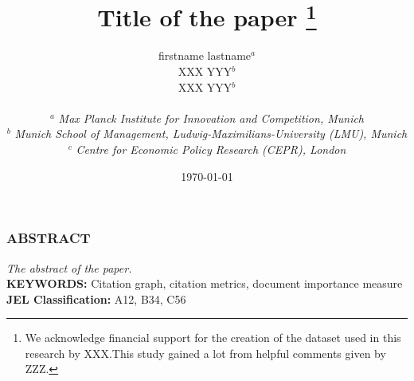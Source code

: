 



\title{\textbf{Title of the paper}
\thanks{We acknowledge financial support for the creation of the dataset used in this research by XXX.This study gained a lot from helpful comments given by ZZZ.}}


\author{
\begin{minipage}{0.3\textwidth}
    \begin{center}
    \vspace{0.1cm}
    {{firstname lastname}}$^{a}$
    \vspace{0.6cm}
    \end{center}
\end{minipage}
\begin{minipage}{0.3\textwidth}
    \begin{center}
    \vspace{0.1cm}
    XXX YYY$^{b}$
    \vspace{0.6cm}
    \end{center}
\end{minipage}
\begin{minipage}{0.3\textwidth}
    \begin{center}
    \vspace{0.1cm}
    XXX YYY$^{b}$
    \vspace{0.6cm}
    \end{center}
\end{minipage}
\\[2ex]
\renewcommand{\parskip}{-5pt}
\footnotesize $^{a}$  \emph{Max Planck Institute for Innovation and Competition, Munich}\\
\footnotesize $^{b}$  \emph{Munich School of Management, Ludwig-Maximilians-University (LMU), Munich}\\
\footnotesize $^{c}$  \emph{Centre for Economic Policy Research (CEPR), London}\\[2ex]
}

\date{\today}
\maketitle
\vspace{5mm}
\thispagestyle{empty}

\begin{center}
\subsubsection*{ABSTRACT}
\end{center}
{\small
\it
The abstract of the paper.
}
%
%
\vspace{10mm}\\
\textbf{KEYWORDS:} Citation graph, citation metrics, document importance measure
\vspace{2mm}\\
\textbf{JEL Classification:} A12, B34, C56


